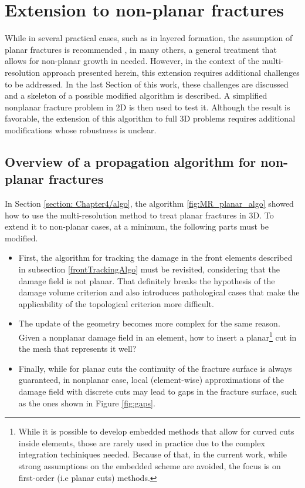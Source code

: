 \section{Extension to non-planar fractures}
\label{section: Chapter4/nonplanar}

While in several practical cases, such as in layered formation, the assumption of planar fractures is recommended \cite{mcclure2020planar}, in many others, a general treatment that allows for non-planar growth in needed. However, in the context of the multi-resolution approach presented herein, this extension requires additional challenges to be addressed. In the last Section of this work, these challenges are discussed and a skeleton of a possible modified algorithm is described. A simplified nonplanar fracture problem in 2D is then used to test it. Although the result is favorable, the extension of this algorithm to full 3D problems requires additional modifications whose robustness is unclear. 

\subsection{Overview of a propagation algorithm for non-planar fractures}\label{basicNonplanarAlgo}

In Section \ref{section: Chapter4/algo}, the algorithm \ref{fig:MR_planar_algo} showed how to use the multi-resolution method to treat planar fractures in 3D. To extend it to non-planar cases, at a minimum, the following parts must be modified. 

\begin{itemize}
    \item First, the algorithm for tracking the damage in the front elements described in subsection \ref{frontTrackingAlgo} must be revisited, considering that the damage field is not planar. That definitely breaks the hypothesis of the damage volume criterion and also introduces pathological cases that make the applicability of the topological criterion more difficult.
    
    \item The update of the geometry becomes more complex for the same reason. Given a nonplanar damage field in an element, how to insert a planar\footnote{While it is possible to develop embedded methods that allow for curved cuts inside elements, those are rarely used in practice due to the complex integration techiniques needed. Because of that, in the current work, while strong assumptions on the embedded scheme are avoided, the focus is on first-order (i.e planar cuts) methods.} cut in the mesh that represents it well?
    
    \item Finally, while for planar cuts the continuity of the fracture surface is always guaranteed, in nonplanar case, local (element-wise) approximations of the damage field with discrete cuts may lead to gaps in the fracture surface, such as the ones shown in Figure \ref{fig:gaps}.
\end{itemize}

